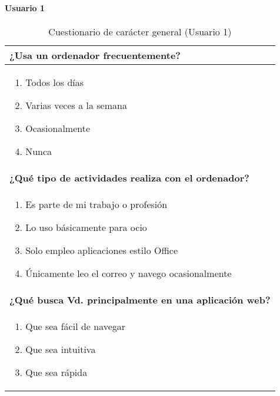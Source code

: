 \paragraph*{Usuario 1}
\begin{table}[H]
\centering
\caption{Cuestionario de carácter general (Usuario 1)}
\begin{tabular}{p{36em}}
\toprule
\rowcolor[rgb]{ .949,  .949,  .949} \textbf{¿Usa un ordenador frecuentemente?} \\ \midrule
\vspace{-4mm}
\begin{enumerate}
\item \colorbox{blue!30}{Todos los días}
\item Varias veces a la semana
\item Ocasionalmente
\item Nunca
\end{enumerate} \\ \midrule
\rowcolor[rgb]{ .949,  .949,  .949} \textbf{¿Qué tipo de actividades realiza con el ordenador?} \\ \midrule
\vspace{-4mm}
\begin{enumerate}
\item Es parte de mi trabajo o profesión
\item \colorbox{blue!30}{Lo uso básicamente para ocio}
\item Solo empleo aplicaciones estilo Office
\item Únicamente leo el correo y navego ocasionalmente
\end{enumerate} \\ \midrule
\rowcolor[rgb]{ .949,  .949,  .949} \textbf{¿Qué busca Vd. principalmente en una aplicación web?} \\ \midrule
\vspace{-4mm}
\begin{enumerate}
\item \colorbox{blue!30}{Que sea fácil de navegar}
\item Que sea intuitiva
\item Que sea rápida
\end{enumerate} \\ \bottomrule
\end{tabular}
\end{table}

